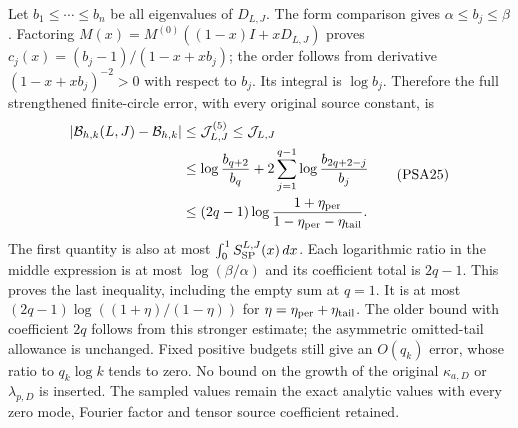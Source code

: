 Let $b_1\le\cdots\le b_n$ be all eigenvalues of $D_{L,J}$.
The form comparison gives $\alpha\le b_j\le\beta$.
Factoring $M(x)=M^{(0)}((1-x)I+xD_{L,J})$ proves
$c_j(x)=(b_j-1)/(1-x+xb_j)$; the order follows from derivative
$(1-x+xb_j)^{-2}>0$ with respect to $b_j$.
Its integral is $\log b_j$. Therefore the full strengthened
finite-circle error, with every original source constant, is
\[
 \begin{aligned}
 |\mathcal B_{h,k}(L,J)-\mathcal B_{h,k}|
 &\le\mathcal J^{(5)}_{L,J}\le\mathcal J_{L,J}\\
 &\le\log\frac{b_{q+2}}{b_q}
       +2\sum_{j=1}^{q-1}\log\frac{b_{2q+2-j}}{b_j}\\
 &\le(2q-1)\log\frac{1+\eta_{\rm per}}
                         {1-\eta_{\rm per}-\eta_{\rm tail}}.
 \end{aligned}
 \tag{PSA25}
\]
The first quantity is also at most $\int_0^1S_{\rm SP}^{L,J}(x)\,dx$.
Each logarithmic ratio in the middle expression is at most
$\log(\beta/\alpha)$ and its coefficient total is $2q-1$.
This proves the last inequality, including the empty sum at $q=1$.
It is at most $(2q-1)\log((1+\eta)/(1-\eta))$ for
$\eta=\eta_{\rm per}+\eta_{\rm tail}$. The older bound with
coefficient $2q$ follows from this stronger estimate; the
asymmetric omitted-tail allowance is unchanged.
Fixed positive budgets still give an $O(q_k)$ error, whose
ratio to $q_k\log k$ tends to zero. No bound on the growth of
the original $\kappa_{a,D}$ or $\lambda_{p,D}$ is inserted.
The sampled values remain the exact analytic values with every
zero mode, Fourier factor and tensor source coefficient retained.




